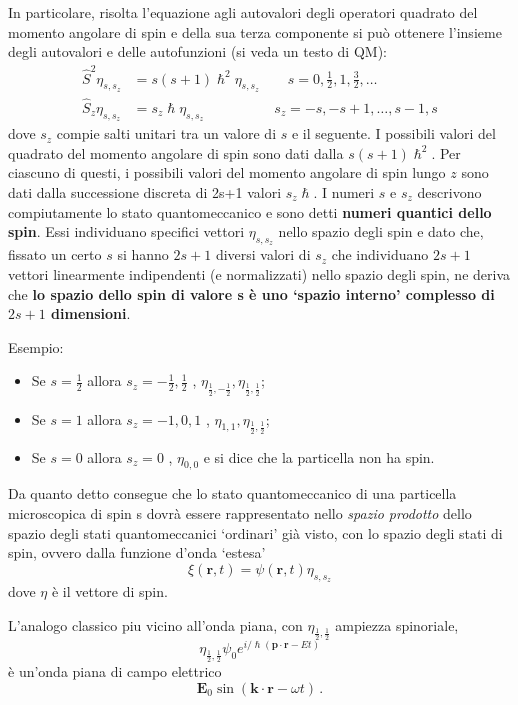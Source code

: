 In particolare, risolta l'equazione agli autovalori degli operatori
quadrato del momento angolare di spin e della sua terza componente si
può ottenere l'insieme degli autovalori e delle autofunzioni (si veda un testo di QM):
\begin{align*}
	\hat{S}^{2} \eta_{s,s_{z}} &= s (s+1) \hslash^{2} \eta_{s,s_{z}} \qquad s = 0, \frac{1}{2}, 1, \frac{3}{2}, \dots\\
	\hat{S}_{z} \eta_{s,s_{z}} &= s_{z} \hslash \eta_{s,s_{z}} \qquad \qquad \quad s_{z} = -s, -s+1, \dots , s-1, s
\end{align*} dove \(s_{z}\) compie salti unitari tra un valore di \(s\) e il
seguente.
I possibili valori del quadrato del momento angolare di spin
sono dati dalla \(s(s+1)\hslash^{2}\).
Per ciascuno di questi, i
possibili valori del momento angolare di spin lungo \(z\) sono dati
dalla successione discreta di 2s+1 valori \(s_{z} \hslash\).
I
numeri \(s\) e \(s_{z}\) descrivono compiutamente lo stato
quantomeccanico e sono detti \textbf{numeri quantici dello spin}.
Essi
individuano specifici vettori \(\eta_{s,s_{z}}\) nello spazio degli spin
e dato che, fissato un certo \(s\) si hanno \(2s+1\) diversi valori di
\(s_{z}\) che individuano \(2s+1\) vettori linearmente indipendenti (e
normalizzati) nello spazio degli spin, ne deriva che \textbf{lo spazio
	dello spin di valore s è uno `spazio interno' complesso di \(2s+1\)
	dimensioni}.

Esempio:
\begin{itemize}
	\item Se \(s = \frac{1}{2}\) allora
	\(s_{z} = - \frac{1}{2} , \frac{1}{2}\) ,
	\(\eta_{\frac{1}{2},- \frac{1}{2}}, \eta_{\frac{1}{2}, \frac{1}{2}}\);
	\item Se \(s = 1\) allora \(s_{z} = -1,0,1\) ,
	\(\eta_{1,1},\eta_{\frac{1}{2}, \frac{1}{2}}\);
	\item Se \(s = 0\) allora
	\(s_{z} = 0\) , \(\eta_{0,0}\) e si dice che la particella non ha spin.
\end{itemize}
Da quanto detto consegue che lo stato quantomeccanico di una particella
microscopica di spin s dovrà essere rappresentato nello \emph{spazio
	prodotto} dello spazio degli stati quantomeccanici `ordinari' già visto,
con lo spazio degli stati di spin, ovvero dalla funzione d'onda `estesa'
\[
	\xi(\bm{r},t) =   \psi(\bm{r},t) \eta_{s,s_{z}}
\] dove \(\eta\) è il vettore di spin.

\begin{marginfigure}
	L'analogo classico piu vicino all'onda piana, con
	\(\eta_{\frac{1}{2}, \frac{1}{2}}\) ampiezza spinoriale,
	\[
		\eta_{\frac{1}{2}, \frac{1}{2}} \psi_{0}e^{ i/\hslash (\bm{p}\cdot \bm{r} - Et)}
	\] è un'onda piana di campo elettrico
	\[
		\bm{E}_{0} \sin(\bm{k}\cdot \bm{r} - \omega t) \, .
	\]
\end{marginfigure}


